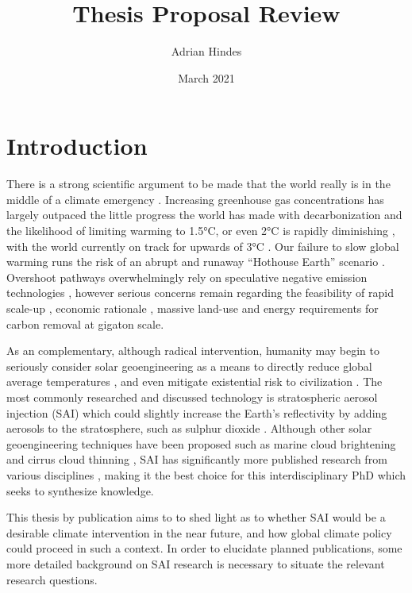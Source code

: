 \documentclass{article}
\title{Thesis Proposal Review}
\author{Adrian Hindes}
\date{March 2021}
\begin{document}
\maketitle

\section*{Introduction}
There is a strong scientific argument to be made that the world really is in the middle of a climate emergency \citep{lenton2019climate}. Increasing greenhouse gas concentrations has largely outpaced the little progress the world has made with decarbonization and the likelihood of limiting warming to 1.5°C, or even 2°C is rapidly diminishing \citep{AusAcademy2021}, with the world currently on track for upwards of 3°C \citep{UNEmissionsReport2020}. Our failure to slow global warming runs the risk of an abrupt and runaway ``Hothouse Earth'' scenario \citep{steffen2018trajectories}. Overshoot pathways overwhelmingly rely on speculative negative emission technologies \citep{intergovernmental2018global}, however serious concerns remain regarding the feasibility of rapid scale-up \citep{buck2016rapid}, economic rationale \citep{fuss2018negative}, massive land-use and energy requirements \citep{fuhrman2020food} for carbon removal at gigaton scale. \medskip

As an complementary, although radical intervention, humanity may begin to seriously consider solar geoengineering as a means to directly reduce global average temperatures \citep{keith2016solar,moreno2013climate,crutzen2006albedo}, and even mitigate existential risk to civilization \citep{halstead2018stratospheric}. The most commonly researched and discussed technology is stratospheric aerosol injection (SAI) which could slightly increase the Earth's reflectivity by adding aerosols to the stratosphere, such as sulphur dioxide \citep{irvine2016overview}. Although other solar geoengineering techniques have been proposed such as marine cloud brightening \citep{latham2012marine} and cirrus cloud thinning \citep{muri2014climatic}, SAI has significantly more published research from various disciplines \citep{NAP2021}, making it the best choice for this interdisciplinary PhD which seeks to synthesize knowledge.  \medskip

This thesis by publication aims to to shed light as to whether SAI would be a desirable climate intervention in the near future, and how global climate policy could proceed in such a context. In order to elucidate planned publications, some more detailed background on SAI research is necessary to situate the relevant research questions.
\clearpage
\end{document}
